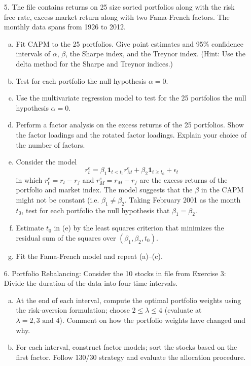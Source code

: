 \begin{enumerate}
\item[5.] The file  contains returns on 25 size sorted portfolios along with the risk free rate, excess market return along with two Fama-French factors. The monthly data spans from 1926 to 2012.
	\begin{enumerate}[(a)]
	\item Fit CAPM to the 25 portfolios. Give point estimates and 95\% confidence intervals of $\alpha$, $\beta$, the Sharpe index, and the Treynor index. (Hint: Use the delta method for the Sharpe and Treynor indices.)
	\item Test for each portfolio the null hypothesis $\alpha=0$.
	\item Use the multivariate regression model to test for the 25 portfolios the null hypothesis $\alpha=0$.
	\item Perform a factor analysis on the excess returns of the 25 portfolios. Show the factor loadings and the rotated factor loadings. Explain your choice of the number of factors.
	\item Consider the model
		\[
		r_t^e= \beta_1 \mathbf{1}_{t<t_0} r_M^e + \beta_2 \mathbf{1}_{t\geq t_0} + \epsilon_t
		\]
	in which $r_t^e=r_t-r_f$ and $r_M^e=r_M-r_f$ are the excess returns of the portfolio and market index. The model suggests that the $\beta$ in the CAPM might not be constant (i.e. $\beta_1\neq\beta_2$. Taking February 2001 as the month $t_0$, test for each portfolio the null hypothesis that $\beta_1=\beta_2$.
	\item Estimate $t_0$ in (e) by the least squares criterion that minimizes the residual sum of the squares over $(\beta_1,\beta_2,t_0)$.
	\item Fit the Fama-French model and repeat (a)--(c). 
	\end{enumerate}




\item[6.] Portfolio Rebalancing: Consider the 10 stocks in file from Exercise 3: Divide the duration of the data into four time intervals.

    \begin{enumerate}[(a)]
    \item At the end of each interval, compute the optimal portfolio weights using the risk-aversion
formulation; choose $2 \leq \lambda \leq 4$ (evaluate at $\lambda = 2, 3 \text{ and } 4$). Comment on how the
portfolio weights have changed and why.
    \item For each interval, construct factor models; sort the stocks based on the first factor. Follow 130/30 strategy and evaluate the allocation procedure.
    \end{enumerate}
    

\end{enumerate}
